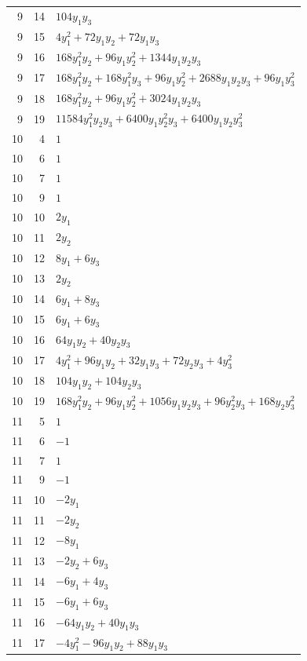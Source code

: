 \documentclass[10pt,a4paper]{article}
\begin{document}
{\begin{longtable}{rrp{125mm}}
9 & 14 & $104 y_{1} y_{3}$\\
9 & 15 & $4 y_{1}^{2} + 72 y_{1} y_{2} + 72 y_{1} y_{3}$\\
9 & 16 & $168 y_{1}^{2} y_{2} + 96 y_{1} y_{2}^{2} + 1344 y_{1} y_{2} y_{3}$\\
9 & 17 & $168 y_{1}^{2} y_{2} + 168 y_{1}^{2} y_{3} + 96 y_{1} y_{2}^{2} + 2688 y_{1} y_{2} y_{3} + 96 y_{1} y_{3}^{2}$\\
9 & 18 & $168 y_{1}^{2} y_{2} + 96 y_{1} y_{2}^{2} + 3024 y_{1} y_{2} y_{3}$\\
9 & 19 & $11584 y_{1}^{2} y_{2} y_{3} + 6400 y_{1} y_{2}^{2} y_{3} + 6400 y_{1} y_{2} y_{3}^{2}$\\
10 & 4 & $1$\\
10 & 6 & $1$\\
10 & 7 & $1$\\
10 & 9 & $1$\\
10 & 10 & $2 y_{1}$\\
10 & 11 & $2 y_{2}$\\
10 & 12 & $8 y_{1} + 6 y_{3}$\\
10 & 13 & $2 y_{2}$\\
10 & 14 & $6 y_{1} + 8 y_{3}$\\
10 & 15 & $6 y_{1} + 6 y_{3}$\\
10 & 16 & $64 y_{1} y_{2} + 40 y_{2} y_{3}$\\
10 & 17 & $4 y_{1}^{2} + 96 y_{1} y_{2} + 32 y_{1} y_{3} + 72 y_{2} y_{3} + 4 y_{3}^{2}$\\
10 & 18 & $104 y_{1} y_{2} + 104 y_{2} y_{3}$\\
10 & 19 & $168 y_{1}^{2} y_{2} + 96 y_{1} y_{2}^{2} + 1056 y_{1} y_{2} y_{3} + 96 y_{2}^{2} y_{3} + 168 y_{2} y_{3}^{2}$\\
11 & 5 & $1$\\
11 & 6 & $-1$\\
11 & 7 & $1$\\
11 & 9 & $-1$\\
11 & 10 & $- 2 y_{1}$\\
11 & 11 & $- 2 y_{2}$\\
11 & 12 & $- 8 y_{1}$\\
11 & 13 & $- 2 y_{2} + 6 y_{3}$\\
11 & 14 & $- 6 y_{1} + 4 y_{3}$\\
11 & 15 & $- 6 y_{1} + 6 y_{3}$\\
11 & 16 & $- 64 y_{1} y_{2} + 40 y_{1} y_{3}$\\
11 & 17 & $- 4 y_{1}^{2} - 96 y_{1} y_{2} + 88 y_{1} y_{3}$\\

\end{longtable}}
\end{document}
